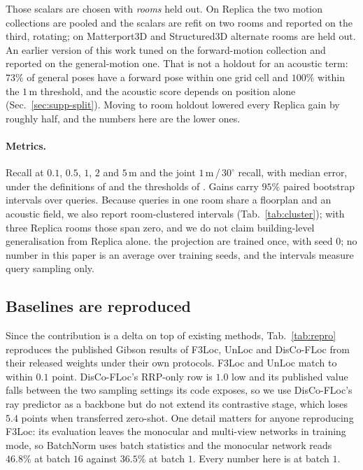Those scalars are chosen with \emph{rooms} held out. On Replica the two motion
collections are pooled and the scalars are refit on two rooms and reported on
the third, rotating; on Matterport3D and Structured3D alternate rooms are held
out. An earlier version of this work tuned on the forward-motion collection and
reported on the general-motion one. That is not a holdout for an acoustic term:
$73\%$ of general poses have a forward pose within one grid cell and $100\%$
within the $1$\,m threshold, and the acoustic score depends on position alone
(Sec.~\ref{sec:supp-split}). Moving to room holdout lowered every Replica gain
by roughly half, and the numbers here are the lower ones.

\paragraph{Metrics.} Recall at $0.1$, $0.5$, $1$, $2$ and $5$\,m and the joint
$1$\,m\,/\,$30^\circ$ recall, with median error, under the definitions of
\cite{f3loc} and the thresholds of \cite{unloc}. Gains carry $95\%$ paired
bootstrap intervals over queries. Because queries in one room share a floorplan
and an acoustic field, we also report room-clustered intervals
(Tab.~\ref{tab:cluster}); with three Replica rooms those span zero, and we do
not claim building-level generalisation from Replica alone.
the projection are trained once, with seed $0$; no number in this paper is an
average over training seeds, and the intervals measure query sampling only.



\subsection{Baselines are reproduced}
\label{sec:repro}

Since the contribution is a delta on top of existing methods, Tab.~\ref{tab:repro}
reproduces the published Gibson results of F3Loc, UnLoc and DisCo-FLoc from
their released weights under their own protocols. F3Loc and UnLoc match to
within $0.1$ point. DisCo-FLoc's RRP-only row is $1.0$ low and its published
value falls between the two sampling settings its code exposes, so we use
DisCo-FLoc's ray predictor as a backbone but do not extend its contrastive
stage, which loses $5.4$ points when transferred zero-shot. One detail matters
for anyone reproducing F3Loc: its evaluation leaves the monocular and
multi-view networks in training mode, so BatchNorm uses batch statistics and
the monocular network reads $46.8\%$ at batch $16$ against $36.5\%$ at batch
$1$. Every number here is at batch $1$.

